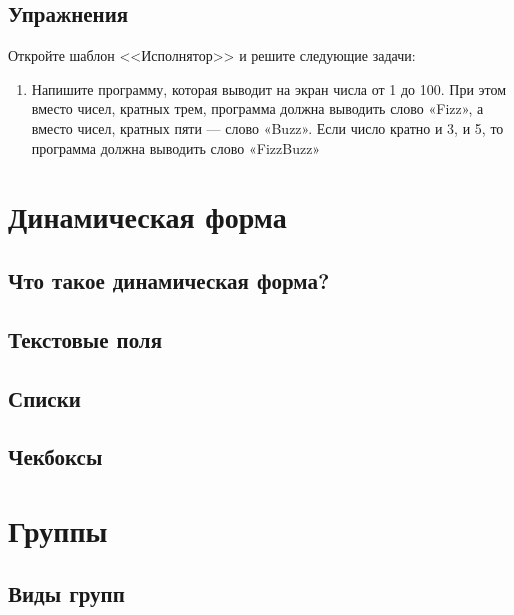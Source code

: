\documentclass[10pt]{book}
\begin{document}
	\section{Упражнения}
	
	Откройте шаблон <<Исполнятор>> и решите следующие задачи:
	
	\begin{enumerate}
	\item Напишите программу, которая выводит на экран числа от 1 до 100. При этом вместо чисел, кратных трем, программа должна выводить слово «Fizz», а вместо чисел, кратных пяти — слово «Buzz». Если число кратно и 3, и 5, то программа должна выводить слово «FizzBuzz»
	
	\end{enumerate}
	
	\chapter{Динамическая форма}
	
	\section{Что такое динамическая форма?}
	
	\section{Текстовые поля}
	
	\section{Списки}
	
	\section{Чекбоксы}
	
	\chapter{Группы}
	
	\section{Виды групп}
	
\end{document}
